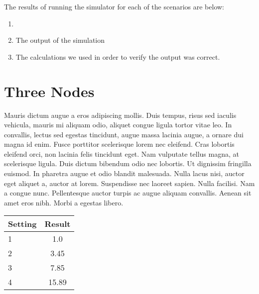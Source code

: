 \documentclass[fleqn,11pt]{article}
\begin{document}
The results of running the simulator for each of the scenarios are below:

\begin{enumerate}

\item 

\item The output of the simulation

\item The calculations we used in order to verify the output was correct.

\end{enumerate}



\section{Three Nodes}

Mauris dictum augue a eros adipiscing mollis. Duis tempus, risus sed
iaculis vehicula, mauris mi aliquam odio, aliquet congue ligula tortor
vitae leo. In convallis, lectus sed egestas tincidunt, augue massa
lacinia augue, a ornare dui magna id enim. Fusce porttitor scelerisque
lorem nec eleifend. Cras lobortis eleifend orci, non lacinia felis
tincidunt eget. Nam vulputate tellus magna, at scelerisque
ligula. Duis dictum bibendum odio nec lobortis. Ut dignissim fringilla
euismod. In pharetra augue et odio blandit malesuada. Nulla lacus
nisi, auctor eget aliquet a, auctor at lorem. Suspendisse nec laoreet
sapien. Nulla facilisi. Nam a congue nunc. Pellentesque auctor turpis
ac augue aliquam convallis. Aenean sit amet eros nibh. Morbi a egestas
libero.

\vspace{0.5cm}
\begin{tabular}{lc}
  \toprule
  Setting & Result\\
  \midrule
  1 & 1.0\\
  2 & 3.45\\
  3 & 7.85\\
  4 & 15.89\\
  \bottomrule
\end{tabular}
\vspace{0.5cm}
\end{document}
